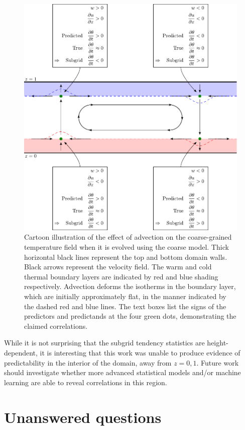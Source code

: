\documentclass[../main.tex]{subfiles}
\begin{document}
\begin{figure}[ht]
    \centering
    \includegraphics[width=0.8\linewidth]{figures/tendency_explanation.pdf}
    \caption{
        Cartoon illustration of the effect of advection on the coarse-grained
        temperature field when it is evolved using the coarse model. Thick
        horizontal black lines represent the top and bottom domain walls. Black
        arrows represent the velocity field. The warm and cold thermal boundary
        layers are indicated by red and blue shading respectively. Advection
        deforms the isotherms in the boundary layer, which are initially
        approximately flat, in the manner indicated by the dashed red and blue
        lines. The text boxes list the signs of the predictors and predictands
        at the four green dots, demonstrating the claimed correlations.
    }
    \label{fig:tendency_explanation}
\end{figure}

While it is not surprising that the subgrid tendency statistics are
height-dependent, it is interesting that this work was unable to produce
evidence of predictability in the interior of the domain, away from $z=0,1$.
Future work should investigate whether more advanced statistical models and/or
machine learning are able to reveal correlations in this region.


\section{Unanswered questions}
\end{document}
